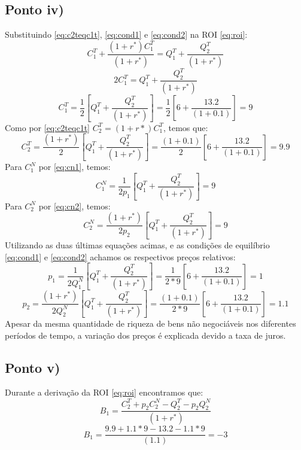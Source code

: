 \documentclass{article}
\begin{document}
\subsection*{Ponto iv)}
Substituindo \eqref{eq:c2teqc1t}, \eqref{eq:cond1} e \eqref{eq:cond2} na ROI \eqref{eq:roi}:
\begin{equation*}
    C_1^T + \frac{(1+r^*)C_1^T}{(1+r^*)} = Q_1^T + \frac{Q_2^T}{(1+r^*)}
\end{equation*}
\begin{equation*}
    2C_1^T = Q_1^T + \frac{Q_2^T}{(1+r^*)}
\end{equation*}
\begin{equation*}
    C_1^T = \frac{1}{2}\left[Q_1^T + \frac{Q_2^T}{(1+r^*)}\right] = 
    \frac{1}{2}\left[6 + \frac{13.2}{(1+0.1)}\right] = 9
\end{equation*}
Como por \eqref{eq:c2teqc1t} $C_2^T=(1+r*)C_1^T$, temos que:
\begin{equation*}
    C_2^T = \frac{(1+r^*)}{2}\left[Q_1^T + \frac{Q_2^T}{(1+r^*)}\right] = \frac{(1+0.1)}{2}\left[6 + \frac{13.2}{(1+0.1)}\right] = 9.9 
\end{equation*}
Para $C_1^N$ por \eqref{eq:cn1}, temos:
\begin{equation*}
    C_1^N=\frac{1}{2p_1}\left[Q_1^T + \frac{Q_2^T}{(1+r^*)}\right]=9
\end{equation*}
Para $C_2^N$ por \eqref{eq:cn2}, temos:
\begin{equation*}
    C_2^N=\frac{(1+r^*)}{2p_2}\left[Q_1^T + \frac{Q_2^T}{(1+r^*)}\right]=9
\end{equation*}
Utilizando as duas últimas equações acimas, e as condições de equilíbrio \eqref{eq:cond1} e \eqref{eq:cond2} achamos os respectivos preços relativos:
\begin{equation*}
    p_1=\frac{1}{2Q_1^N}\left[Q_1^T + \frac{Q_2^T}{(1+r^*)}\right]=
    \frac{1}{2*9}\left[6 + \frac{13.2}{(1+0.1)}\right]=1
\end{equation*}
\begin{equation*}
    p_2=\frac{(1+r^*)}{2Q_2^N}\left[Q_1^T + \frac{Q_2^T}{(1+r^*)}\right]=
    \frac{(1+0.1)}{2*9}\left[6 + \frac{13.2}{(1+0.1)}\right]=1.1
\end{equation*}
Apesar da mesma quantidade de riqueza de bens não negociáveis nos diferentes períodos de tempo, a variação dos preços é explicada devido a taxa de juros.
\subsection*{Ponto v)}
Durante a derivação da ROI \eqref{eq:roi} encontramos que:
\begin{equation*}
    B_1 = \frac{C_2^T + p_2 C_2^N - Q_2^T - p_2 Q_2^N}{(1+r^*)}
\end{equation*}
\begin{equation*}
    B_1 = \frac{9.9 + 1.1* 9 - 13.2 - 1.1* 9}{(1.1)}=-3
\end{equation*}
\end{document}
